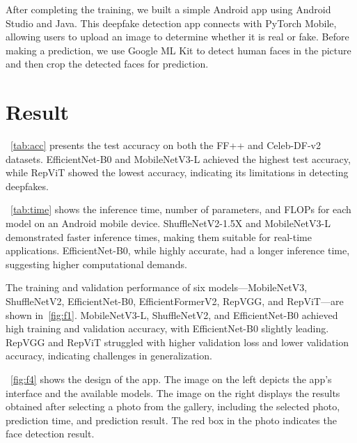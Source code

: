 \documentclass[10pt,twocolumn,letterpaper]{article}
\begin{document}
After completing the training, we built a simple Android app using Android Studio and Java. This deepfake detection app connects with PyTorch Mobile, allowing users to upload an image to determine whether it is real or fake. Before making a prediction, we use Google ML Kit to detect human faces in the picture and then crop the detected faces for prediction.

\section{Result}
~\cref{tab:acc} presents the test accuracy on both the FF++\cite{Rossler_2019_ICCV} and Celeb-DF-v2\cite{li2020celebdf} datasets. EfficientNet-B0\cite{tan2020efficientnet} and MobileNetV3-L\cite{howard2019searching} achieved the highest test accuracy, while RepViT\cite{wang2024repvit} showed the lowest accuracy, indicating its limitations in detecting deepfakes.

~\cref{tab:time} shows the inference time, number of parameters, and FLOPs for each model on an Android mobile device. ShuffleNetV2-1.5X\cite{ma2018shufflenet} and MobileNetV3-L\cite{howard2019searching} demonstrated faster inference times, making them suitable for real-time applications. EfficientNet-B0\cite{tan2020efficientnet}, while highly accurate, had a longer inference time, suggesting higher computational demands.

The training and validation performance of six models—MobileNetV3\cite{howard2019searching}, ShuffleNetV2\cite{ma2018shufflenet}, EfficientNet-B0\cite{tan2020efficientnet}, EfficientFormerV2\cite{li2023rethinking}, RepVGG\cite{ding2021repvgg}, and RepViT\cite{wang2024repvit}—are shown in~\cref{fig:f1}. MobileNetV3-L\cite{howard2019searching}, ShuffleNetV2\cite{ma2018shufflenet}, and EfficientNet-B0\cite{tan2020efficientnet} achieved high training and validation accuracy, with EfficientNet-B0\cite{tan2020efficientnet} slightly leading. RepVGG\cite{ding2021repvgg} and RepViT\cite{wang2024repvit} struggled with higher validation loss and lower validation accuracy, indicating challenges in generalization. 

~\cref{fig:f4} shows the design of the app. The image on the left depicts the app’s interface and the available models. The image on the right displays the results obtained after selecting a photo from the gallery, including the selected photo, prediction time, and prediction result. The red box in the photo indicates the face detection result.
\end{document}
